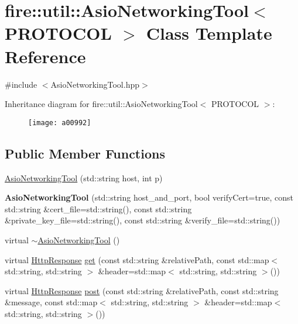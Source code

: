 \hypertarget{a00992}{}\section{fire\+:\+:util\+:\+:Asio\+Networking\+Tool$<$ P\+R\+O\+T\+O\+C\+OL $>$ Class Template Reference}
\label{a00992}


{\ttfamily \#include $<$Asio\+Networking\+Tool.\+hpp$>$}

Inheritance diagram for fire\+:\+:util\+:\+:Asio\+Networking\+Tool$<$ P\+R\+O\+T\+O\+C\+OL $>$\+:\begin{figure}[H]
\begin{center}
\leavevmode
\texttt{[image: a00992]}
\end{center}
\end{figure}
\subsection*{Public Member Functions}
\begin{DoxyCompactItemize}
\item 
\hyperlink{a00992_a5edd72ce9937e052a82e7564500b3861}{Asio\+Networking\+Tool} (std\+::string host, int p)
\item 
\mbox{\label{a00992_a5826de4a9e051ec854ad7be3a48ac86d}} 
{\bfseries Asio\+Networking\+Tool} (std\+::string host\+\_\+and\+\_\+port, bool verify\+Cert=true, const std\+::string \&cert\+\_\+file=std\+::string(), const std\+::string \&private\+\_\+key\+\_\+file=std\+::string(), const std\+::string \&verify\+\_\+file=std\+::string())
\item 
virtual \hyperlink{a00992_afc51c728e1bd136b6729ac892df490ab}{$\sim$\+Asio\+Networking\+Tool} ()
\item 
virtual \hyperlink{a00996}{Http\+Response} \hyperlink{a00992_a42609f768f245acf0867889e920c5d49}{get} (const std\+::string \&relative\+Path, const std\+::map$<$ std\+::string, std\+::string $>$ \&header=std\+::map$<$ std\+::string, std\+::string $>$())
\item 
virtual \hyperlink{a00996}{Http\+Response} \hyperlink{a00992_a2ac524ceef89fceb928cf74420bf90a5}{post} (const std\+::string \&relative\+Path, const std\+::string \&message, const std\+::map$<$ std\+::string, std\+::string $>$ \&header=std\+::map$<$ std\+::string, std\+::string $>$())
\end{DoxyCompactItemize}
